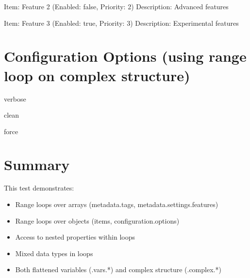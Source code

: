 \documentclass{article}
\begin{document}
Item: Feature 2 (Enabled: false, Priority: 2)
Description: Advanced features\par

Item: Feature 3 (Enabled: true, Priority: 3)
Description: Experimental features\par


\section{Configuration Options (using range loop on complex structure)}

verbose\par

clean\par

force\par


\section{Summary}
This test demonstrates:
\begin{itemize}
\item Range loops over arrays (metadata.tags, metadata.settings.features)
\item Range loops over objects (items, configuration.options)
\item Access to nested properties within loops
\item Mixed data types in loops
\item Both flattened variables (.vars.*) and complex structure (.complex.*)
\end{itemize}
\end{document}
